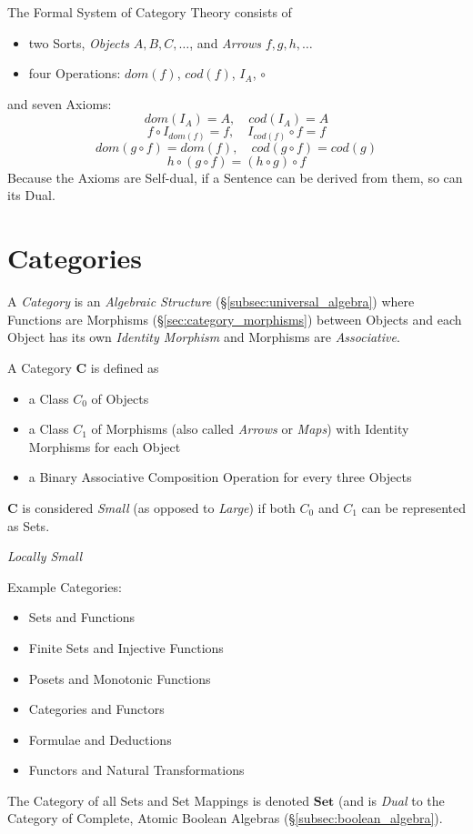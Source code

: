 \documentclass{article}
\begin{document}
The Formal System of Category Theory consists of
\begin{itemize}
\item two Sorts, \emph{Objects} $A,B,C,\ldots$, and \emph{Arrows}
  $f,g,h,\ldots$
\item four Operations: $dom(f)$, $cod(f)$, $I_A$, $\circ$
\end{itemize}
and seven Axioms:
\[
    dom(I_A) = A,\quad cod(I_A) = A
\]\[
    f \circ I_{dom(f)} = f, \quad I_{cod(f)} \circ f = f
\]\[
    dom(g\circ f) = dom(f), \quad cod(g \circ f) = cod(g)
\]\[
    h \circ (g \circ f) = (h \circ g) \circ f
\]
Because the Axioms are Self-dual, if a Sentence can be derived from
them, so can its Dual.

\section{Categories}\label{sec:categories}

A \emph{Category} is an \emph{Algebraic Structure}
(\S\ref{subsec:universal_algebra}) where Functions are Morphisms
(\S\ref{sec:category_morphisms}) between Objects and each Object has
its own \emph{Identity Morphism} and Morphisms are \emph{Associative}.

A Category $\mathbf{C}$ is defined as
\begin{itemize}
\item a Class $C_0$ of Objects
\item a Class $C_1$ of Morphisms (also called \emph{Arrows} or
  \emph{Maps}) with Identity Morphisms for each Object
\item a Binary Associative Composition Operation for every three
  Objects
\end{itemize}
$\mathbf{C}$ is considered \emph{Small} (as opposed to \emph{Large})
if both $C_0$ and $C_1$ can be represented as Sets.

\emph{Locally Small}

Example Categories:
\begin{itemize}
\item Sets and Functions
\item Finite Sets and Injective Functions
\item Posets and Monotonic Functions
\item Categories and Functors
\item Formulae and Deductions
\item Functors and Natural Transformations
\end{itemize}
The Category of all Sets and Set Mappings is denoted $\mathbf{Set}$
(and is \emph{Dual} to the Category of Complete, Atomic Boolean
Algebras (\S\ref{subsec:boolean_algebra}).
\end{document}
